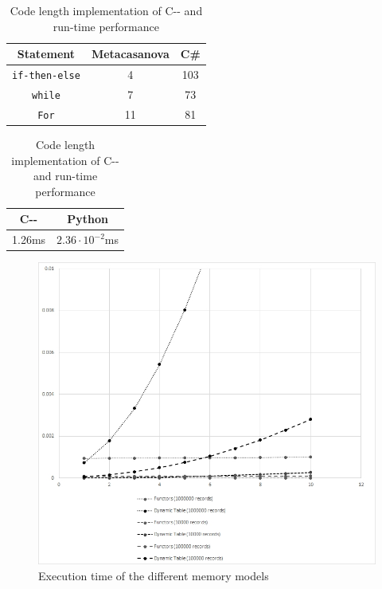 \begin{table}
	\centering
	\caption{Code length implementation of C-{}- and run-time performance}
	\begin{tabular}{|c|c|c|}
		\hline
		\textbf{Statement} & \textbf{Metacasanova} & \textbf{C\#}\\
		\hline
		\texttt{if-then-else} & 4 & 103 \\
		\hline
		\texttt{while} & 7 & 73 \\
		\hline
		\texttt{For} & 11 & 81\\
		\hline
	\end{tabular}
	\begin{tabular}{|c|c|}
		\hline
		\textbf{C-{}-} & \textbf{Python} \\
		\hline
		1.26ms & $2.36 \cdot 10^{-2}$ms \\
		\hline
	\end{tabular}
	\label{tab:cmm}
\end{table}

\begin{figure}
	\label{fig:chart}
	\includegraphics[width = \columnwidth]{Figures/chart.jpg}
	\caption{Execution time of the different memory models}
\end{figure}